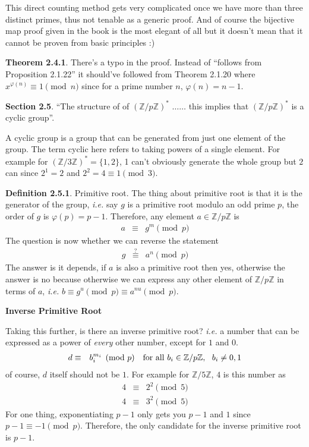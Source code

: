 \documentclass[aps,preprint,preprintnumbers,nofootinbib,showpacs,prd]{revtex4-1}
\newcommand{\ie}{{\it i.e.} }
\newcommand{\nbea}{\begin{eqnarray*}}
\newcommand{\neea}{\end{eqnarray*}}
\begin{document}
This direct counting method gets very complicated once we have more than three distinct primes, thus not tenable as a generic proof. And of course the bijective map proof given in the book is the most elegant of all but it doesn't mean that it cannot be proven from basic principles :) 

{\bf Theorem 2.4.1}. There's a typo in the proof. Instead of ``follows from Proposition 2.1.22'' it should've followed from Theorem 2.1.20 where $x^{\varphi(n)} \equiv 1 \pmod{n}$ since for a prime number $n$, $\varphi(n) = n-1$.

{\bf Section 2.5}. ``The structure of of $(\mathbb{Z}/p\mathbb{Z})^*$ $\dots \dots$ this implies that $(\mathbb{Z}/p\mathbb{Z})^*$ is a cyclic group''.

A cyclic group is a group that can be generated from just one element of the group. The term cyclic here refers to taking powers of a single element. For example for $(\mathbb{Z}/3\mathbb{Z})^* = \{1,2\}$, 1 can't obviously generate the whole group but $2$ can since $2^1 = 2$ and $2^2 = 4 \equiv 1 \pmod{3}$.

{\bf Definition 2.5.1}. Primitive root. The thing about primitive root is that it is the generator of the group, \ie say $g$ is a primitive root modulo an odd prime $p$, the order of $g$ is $\varphi(p) = p-1$. Therefore, any element $a \in \mathbb{Z}/p\mathbb{Z}$ is
%
\nbea
a & \equiv & g^m \pmod{p}
\neea
%
The question is now whether we can reverse the statement
%
\nbea
g & \stackrel{?}{\equiv} & a^n \pmod{p}
\neea
%
The answer is it depends, if $a$ is also a primitive root then yes, otherwise the answer is no because otherwise we can express any other element of $\mathbb{Z}/p\mathbb{Z}$ in terms of $a$, \ie $b \equiv g^u \pmod{p} \equiv a^{nu} \pmod{p}$.

\bigskip
{\bf Inverse Primitive Root}

Taking this further, is there an inverse primitive root? \ie a number that can be expressed as a power of {\it every} other number, except for $1$ and $0$. 
%
\nbea
d & \equiv & b_i^{m_i} \pmod{p}~~~{\rm for~all~} b_i \in \mathbb{Z}/p\mathbb{Z}, ~~b_i \neq 0,1
\neea
%
of course, $d$ itself should not be $1$. For example for $\mathbb{Z}/5\mathbb{Z}$, $4$ is this number as
%
\nbea
4 & \equiv & 2^2 \pmod{5} \\
4 & \equiv & 3^2 \pmod{5}
\neea
%
For one thing, exponentiating $p-1$ only gets you $p-1$ and $1$ since $p-1 \equiv -1 \pmod{p}$. Therefore, the only candidate for the inverse primitive root is $p-1$.
\end{document}
